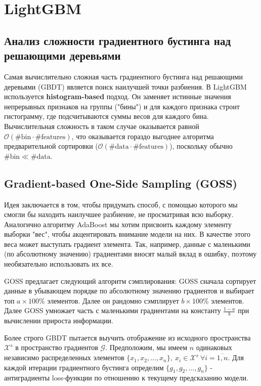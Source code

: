 \section{LightGBM}

\subsection{Анализ сложности градиентного бустинга над решающими деревьями}

Самая вычислительно сложная часть градиентного бустинга над решающими деревьями (GBDT) является поиск наилучшей точки разбиения. В LightGBM используется \textbf{histogram-based} подход. Он заменяет истинные значения непрерывных признаков на группы ("бины") и для каждого признака строит гистограмму, где подсчитываются суммы весов для каждого бина. Вычислительная сложность в таком случае оказывается равной $\mathcal{O}(\#\text{bin}\cdot\#\text{features})$, что оказывается гораздо выгоднее алгоритма предварительной сортировки ($\mathcal{O}(\#\text{data}\cdot\#\text{features})$), поскольку обычно $\#\text{bin} \ll \#\text{data}$.

\subsection{Gradient-based One-Side Sampling (GOSS)}

Идея заключается в том, чтобы придумать способ, с помощью которого мы смогли бы находить наилучшее разбиение, не просматривая всю выборку. Аналогично алгоритму AdaBoost мы хотим присвоить каждому элементу выборки "вес", чтобы акцентировать внимание модели на них. В качестве этого веса может выступать градиент элемента. Так, например, данные с маленькими (по абсолютному значению) градиентами вносят малый вклад в ошибку, поэтому необязательно использовать их все.

GOSS предлагает следующий алгоритм сэмплирования: GOSS сначала сортирует данные в убывающем порядке по абсолютному значению градиентов и выбирает топ $a\times 100\%$ элементов. Далее он рандомно сэмплирует $b\times100\%$ элементов. Далее GOSS умножает часть с маленькими градиентами на константу $\frac{1 - a}{b}$ при вычислении прироста информации.

Более строго GBDT пытается выучить отображение из исходного пространства $\mathcal{X}^s$ в пространство градиентов $\mathcal{G}$. Предположим, мы имеем $n$ одинаковых независимо распределенных элементов $\{x_1, x_2, \ldots, x_n\}, \ x_i \in \mathcal{X}^s \ \forall i = \overline{1,n}$. Для каждой итерации градиентного бустинга определим $\{g_1, g_2, \ldots, g_n\}$ - антиградиенты loss-функции по отношению к текущему предсказанию модели.

